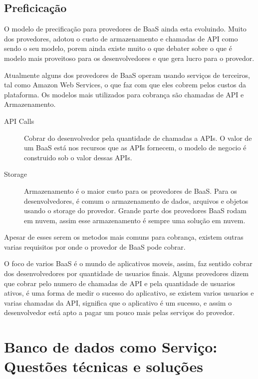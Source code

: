 	\subsection{Preficicação}
	O modelo de precificação para provedores de BaaS ainda esta evoluindo. Muito dos provedores, adotou o custo de armazenamento e chamadas de API como sendo o seu modelo, porem ainda existe muito o que debater sobre o que é modelo mais proveitoso para os desenvolvedores e que gera lucro para o provedor.

	Atualmente alguns dos provedores de BaaS operam usando serviços de terceiros, tal como Amazon Web Services, o que faz com que eles cobrem pelos custos da plataforma. Os modelos mais utilizados para cobrança são chamadas de API e Armazenamento.

	\begin{description}
		\item[]
		\item[API Calls]{ Cobrar do desenvolvedor pela quantidade de chamadas a APIs. O valor de um BaaS está nos recursos que as APIs fornecem, o modelo de negocio é construido sob o valor dessas APIs.}
		
		\item[Storage]{ Armazenamento é o maior custo para os provedores de BaaS. Para os desenvolvedores, é comum o armazenamento de dados, arquivos e objetos usando o storage do provedor. Grande parte dos provedores BaaS rodam em nuvem, assim esse armazenamento é sempre uma solução em nuvem. }
	\end{description}

	Apesar de esses serem os metodos mais comuns para cobrança, existem outras varias requisitos por onde o provedor de BaaS pode cobrar.


	O foco de varios BaaS é o mundo de aplicativos moveis, assim, faz sentido cobrar dos desenvolvedores por quantidade de usuarios finais.	Alguns provedores dizem que cobrar pelo numero de chamadas de API e pela quantidade de usuarios ativos, é uma forma de medir o sucesso do aplicativo, se existem varios usuarios e varias chamadas da API, significa que o aplicativo é um sucesso, e assim o desenvolvedor está apto a pagar um pouco mais pelas serviços do provedor.
	
\section{Banco de dados como Serviço: Questões técnicas e soluções}

